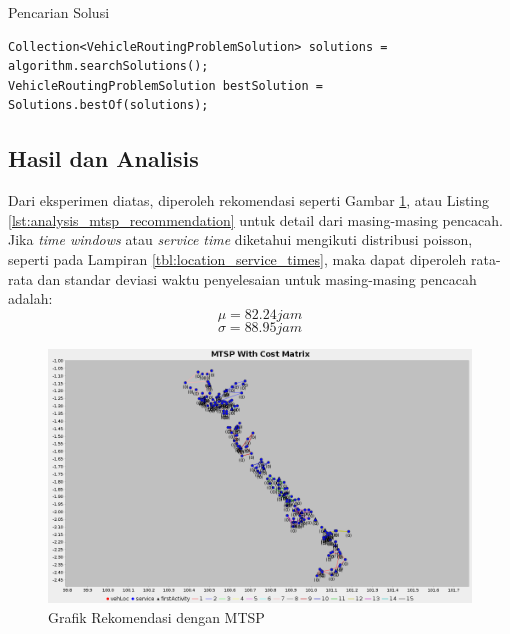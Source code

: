 \begin{listing}
	\caption{Pencarian Solusi}
	\label{lst:jsprit_search_solution}
	\begin{verbatim}
Collection<VehicleRoutingProblemSolution> solutions = algorithm.searchSolutions();
VehicleRoutingProblemSolution bestSolution = Solutions.bestOf(solutions);
	\end{verbatim}
\end{listing}


\subsection{Hasil dan Analisis}
Dari eksperimen diatas, diperoleh rekomendasi seperti Gambar \ref{fig:analysis_mtsp_recommendation}, atau Listing \ref{lst:analysis_mtsp_recommendation} untuk detail dari masing-masing pencacah. Jika \textit{time windows} atau \textit{service time} diketahui mengikuti distribusi poisson, seperti pada Lampiran \ref{tbl:location_service_times}, maka dapat diperoleh rata-rata dan standar deviasi waktu penyelesaian untuk masing-masing pencacah adalah:
$$ \mu = 82.24 jam $$
$$ \sigma = 88.95 jam $$


\begin{figure}[h]
	\centering
	\includegraphics[width=\textwidth]{../../Resources/Images/analysis_mtsp_no_time_windows}
	\caption{Grafik Rekomendasi dengan MTSP}
	\label{fig:analysis_mtsp_recommendation}
\end{figure}


